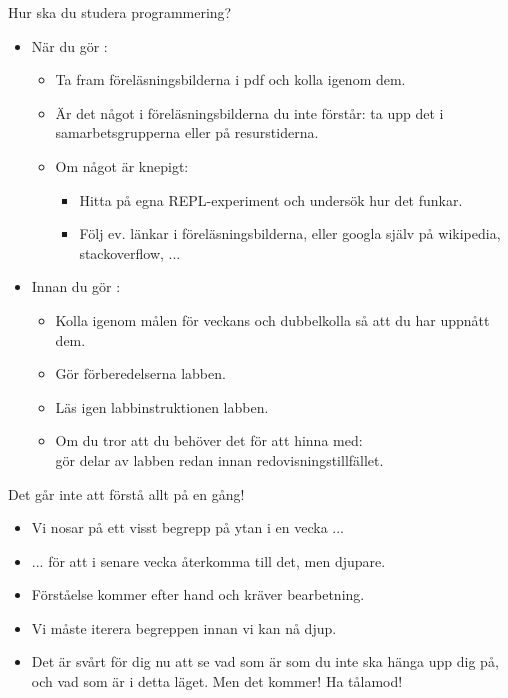 \begin{Slide}{Hur ska du studera programmering?}
\begin{itemize}
\item När du gör :
\begin{itemize}
\item Ta fram föreläsningsbilderna i pdf och kolla igenom dem.
\item Är det något i föreläsningsbilderna du inte förstår: ta upp det i samarbetsgrupperna eller på resurstiderna.
\item Om något är knepigt: 
\begin{itemize}
\item Hitta på egna REPL-experiment och undersök hur det funkar.
\item Följ ev. länkar i föreläsningsbilderna, eller googla själv på wikipedia, stackoverflow, ...
\end{itemize}
\end{itemize}

\item Innan du gör :
\begin{itemize}
\item Kolla igenom målen för veckans  och dubbelkolla så att du har uppnått dem.
\item Gör förberedelserna  labben.
\item Läs igen  labbinstruktionen  labben.
\item Om du tror att du behöver det för att hinna med: \\ gör delar av labben redan innan redovisningstillfället.
\end{itemize}
\end{itemize}

\end{Slide}

\begin{Slide}{Det går inte att förstå allt på en gång!}
\begin{itemize}
\item Vi nosar på ett visst begrepp på ytan i en vecka ... 

\item ... för att i senare vecka återkomma till det, men djupare.

\item Förståelse kommer efter hand och kräver bearbetning.

\item Vi måste iterera begreppen innan vi kan nå djup.

\pause\item Det är svårt för dig nu att se vad som är  som du inte ska hänga upp dig på, och vad som är  i detta läget. Men det kommer! Ha tålamod! 
\end{itemize}

\end{Slide}


